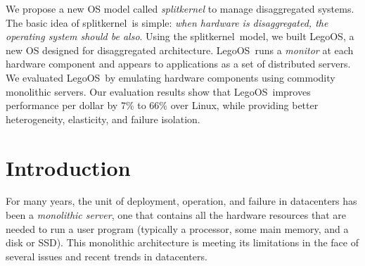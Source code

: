 \documentclass[10pt,times,twocolumn]{z2-article}
\renewcommand{\em}{\it}
\newcommand{\splitkernel}{splitkernel}
\newcommand{\lego}{LegoOS}
\newcommand{\microos}{monitor}
\providecommand{\DIFdelbegin}{} %
\providecommand{\DIFdelend}{} %
\newcommand{\DIFscaledelfig}{0.5}
\newlength{\DIFdelgraphicswidth} %
\newlength{\DIFdelgraphicsheight} %
\newcommand{\DIFdelincludegraphics}[2][]{%
\sbox{\DIFdelgraphicsbox}{\DIFOincludegraphics[#1]{#2}}%
\settoboxwidth{\DIFdelgraphicswidth}{\DIFdelgraphicsbox} %
\settoboxtotalheight{\DIFdelgraphicsheight}{\DIFdelgraphicsbox} %
\scalebox{\DIFscaledelfig}{%
\parbox[b]{\DIFdelgraphicswidth}{\usebox{\DIFdelgraphicsbox}\\[-\baselineskip] \rule{\DIFdelgraphicswidth}{0em}}\llap{\resizebox{\DIFdelgraphicswidth}{\DIFdelgraphicsheight}{%
\setlength{\unitlength}{\DIFdelgraphicswidth}%
\begin{picture}(1,1)%
\thicklines\linethickness{2pt} %
{\color[rgb]{1,0,0}\put(0,0){\framebox(1,1){}}}%
{\color[rgb]{1,0,0}\put(0,0){\line( 1,1){1}}}%
{\color[rgb]{1,0,0}\put(0,1){\line(1,-1){1}}}%
\end{picture}%
}\hspace*{3pt}}} %
} %
\DeclareRobustCommand{\DIFdelbegin}{\DIFOdelbegin \let\includegraphics\DIFdelincludegraphics} %
\DeclareRobustCommand{\DIFdelend}{\DIFOaddend \let\includegraphics\DIFOincludegraphics} %
\begin{document}
We propose a new OS model called {\em \splitkernel} to manage disaggregated systems.
The basic idea of \splitkernel\ is simple: 
\textit{when hardware is disaggregated, the operating system should be also}.  
Using the \splitkernel\ model, we built \lego, 
a new OS designed for disaggregated architecture. 
\lego\ runs a {\em \microos} at each hardware component
and appears to applications as a set of distributed servers.
We evaluated \lego\ by emulating hardware components using commodity monolithic servers.
Our evaluation results show that \lego\ improves performance per dollar by 7\% to 66\% over Linux,
while providing better heterogeneity, elasticity, and failure isolation.
\fi


\section{Introduction}
\label{sec:introduction}

\DIFdelbegin %


\DIFdelend For many years, the unit of deployment, operation, and failure in datacenters has been a {\em monolithic server},
one that contains all the hardware resources 
that are needed to run a user program
(typically a processor, some main memory, and a disk or SSD).
This monolithic architecture is meeting its limitations in the face of 
several issues and recent trends in datacenters.
\end{document}
